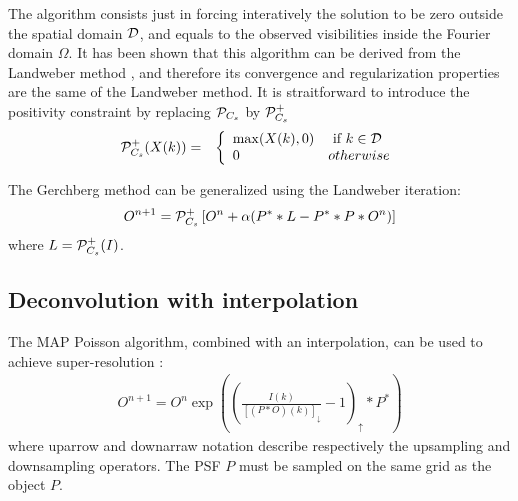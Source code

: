 \documentclass[11pt,a4paper]{article}
\begin{document}
The algorithm consists just in forcing interatively the solution to be 
zero outside the spatial domain ${\cal D}$, and equals to the observed 
visibilities inside the Fourier domain $\Omega$. It has been shown that
this algorithm can be derived from the Landweber method \cite{ima:bertero98},
and therefore its convergence and regularization properties are the same of
the Landweber method. It is straitforward to introduce the positivity 
constraint by replacing ${\cal P}_{C_s}$ by  ${\cal P}^+_{C_s}$
\begin{eqnarray}
 {\cal P}^+_{C_s}(X(k))  & =  & \left\{
  \begin{array}{ll}
  \max(X(k), 0)    & \mbox{ if }  k \in {\cal D}    \\
   0   &  otherwise
  \end{array}
  \right.  \nonumber 
\end{eqnarray}

The Gerchberg method can be generalized \cite{ima:bertero98} using the
Landweber iteration:
\begin{eqnarray}
O^{n+1} =  {\cal P}^+_{C_s} \left[ O^{n} + \alpha (P^* * L - P^* * P* O^n) \right]
\end{eqnarray}
where $L = {\cal P}^+_{C_s}(I)$.

\subsection{Deconvolution with interpolation}
The MAP Poisson algorithm, combined with an interpolation, can be used
to achieve super-resolution \cite{rest:hunt94}: 
\begin{eqnarray}
O^{n+1} =   O^{n} \exp \left(  \left(  \frac{ I(k)}{ \left[ (P*O)(k) \right]_{\downarrow} } -1  \right)_{\uparrow} * P^* \right)
\end{eqnarray}
where uparrow and downarraw notation describe respectively the upsampling
and downsampling operators. The PSF $P$ must be sampled on the same grid
as the object $P$.
\end{document}
